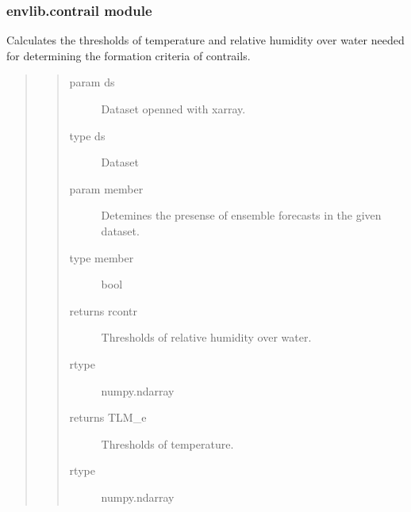 \documentclass[a4paper,11pt,english]{sphinxmanual}
\begin{document}
\subsubsection{envlib.contrail module}
\label{\detokenize{envlib:module-envlib.contrail}}\label{\detokenize{envlib:envlib-contrail-module}}

\begin{fulllineitems}
\label{\detokenize{envlib:envlib.contrail.get_cont_form_thr}}
\sphinxAtStartPar
Calculates the thresholds of temperature and relative humidity over water needed for determining the
formation criteria of contrails.
\begin{quote}
\begin{quote}\begin{description}
\item[{param ds}] \leavevmode
\sphinxAtStartPar
Dataset openned with xarray.

\item[{type ds}] \leavevmode
\sphinxAtStartPar
Dataset

\item[{param member}] \leavevmode
\sphinxAtStartPar
Detemines the presense of ensemble forecasts in the given dataset.

\item[{type member}] \leavevmode
\sphinxAtStartPar
bool

\item[{returns rcontr}] \leavevmode
\sphinxAtStartPar
Thresholds of relative humidity over water.

\item[{rtype}] \leavevmode
\sphinxAtStartPar
numpy.ndarray

\item[{returns TLM\_e}] \leavevmode
\sphinxAtStartPar
Thresholds of temperature.

\item[{rtype}] \leavevmode
\sphinxAtStartPar
numpy.ndarray

\end{description}\end{quote}
\end{quote}

\end{fulllineitems}
\end{document}
